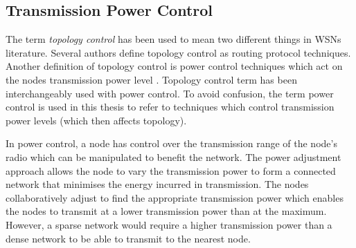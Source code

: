 
\subsection{Transmission Power Control} 
The term \textit{topology control} has been used to mean two different things in WSNs literature. Several authors define topology control as routing protocol techniques. Another definition of topology control is power control techniques which act on the nodes transmission power level \cite{santitopologycontrol}. Topology control term has been interchangeably used with power control. To avoid confusion, the term power control is used in this thesis to refer to techniques which control transmission power levels (which then affects topology).

In power control, a node has control over the transmission range of the node's radio which can be manipulated to benefit the network. The power adjustment approach allows the node to vary the transmission power to form a connected network that minimises the energy incurred in transmission. The nodes collaboratively adjust to find the appropriate transmission power which enables the nodes to transmit at a lower transmission power than at the maximum. However, a sparse network would require a higher transmission power than a dense network to be able to transmit to the nearest node. 

